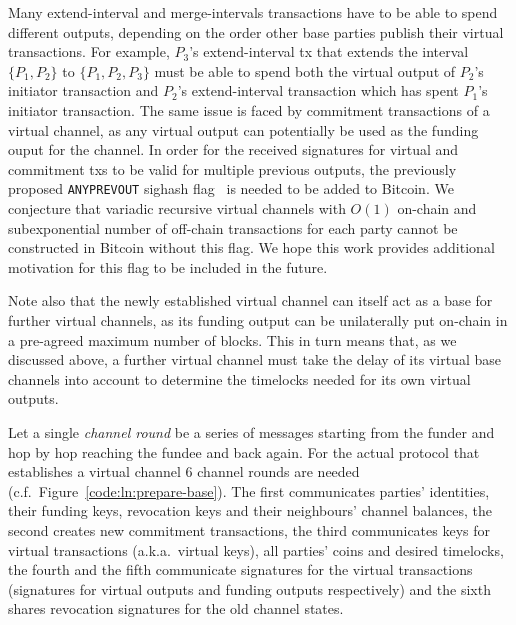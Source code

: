   Many extend-interval and merge-intervals transactions have to be able to spend
  different outputs, depending on the order other base parties publish their
  virtual transactions. For example, $P_3$'s extend-interval tx that extends the
  interval $\{P_1, P_2\}$ to $\{P_1, P_2, P_3\}$ must be able to spend both
  the virtual output of $P_2$'s initiator transaction and $P_2$'s
  extend-interval transaction which has spent $P_1$'s initiator transaction. The
  same issue is faced by commitment transactions of a virtual channel, as any
  virtual output can potentially be used as the funding ouput for the channel.
  In order for the received signatures for virtual and commitment txs to be
  valid for multiple previous outputs, the previously proposed
  \texttt{ANYPREVOUT} sighash flag~\cite{anyprevout} is needed to be added to
  Bitcoin. We conjecture that variadic recursive
  virtual channels with $O(1)$ on-chain and subexponential number of off-chain
  transactions for each party cannot be constructed in Bitcoin without this
  flag. We hope this work provides additional motivation for this flag to be
  included in the future.

  Note also that the newly established virtual channel can itself act as a base
  for further virtual channels, as its funding output can be unilaterally put
  on-chain in a pre-agreed maximum number of blocks. This in turn means that, as
  we discussed above, a further virtual channel must take the delay of its
  virtual base channels into account to determine the timelocks needed for its
  own virtual outputs.

  Let a single \emph{channel round} be a series of messages starting from the
  funder and hop by hop reaching the fundee and back again. For the actual
  protocol that establishes a virtual channel $6$ channel rounds are needed
  (c.f.\ Figure~\ref{code:ln:prepare-base}). The first communicates
  parties' identities, their funding keys, revocation keys and their neighbours'
  channel balances, the second creates new commitment transactions, the third
  communicates keys for virtual transactions (a.k.a.\ virtual keys), all parties'
  coins and desired timelocks, the fourth and the
  fifth communicate signatures for the virtual transactions (signatures for
  virtual outputs and funding outputs respectively) and the sixth shares
  revocation signatures for the old channel states.

